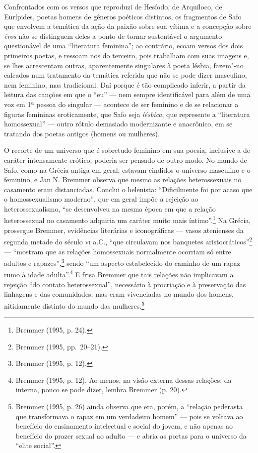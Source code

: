 Confrontados com os versos que reproduzi de Hesíodo, de Arquíloco, de Eurípides,
poetas homens de gêneros poéticos distintos, os fragmentos de Safo que envolvem
a temática da ação da paixão sobre sua vítima e a concepção sobre \textit{éros}
não se distinguem deles a ponto de tornar sustentável o argumento questionável
de uma “literatura feminina”; ao contrário, ecoam versos
dos dois primeiros poetas, e ressoam nos do terceiro, pois trabalham com
suas imagens e, se lhes acrescentam outras, aparentemente singulares à poeta
lésbia, fazem"-no calcados num tratamento da temática referida que não se pode
dizer masculino, nem feminino, mas tradicional. Daí porque é tão complicado
inferir, a partir da leitura das canções em que o “eu” --- nem sempre
identificável para além de uma voz em 1ª pessoa do singular --- acontece de ser
feminino e de se relacionar a figuras femininas eroticamente, que Safo seja
\textit{lésbica}, que represente a “literatura homossexual” --- outro rótulo
demasiado modernizante e anacrônico, em se tratando dos poetas antigos
(homens ou mulheres).

O recorte de um universo que é sobretudo feminino em sua poesia, inclusive
a de caráter intensamente erótico, poderia ser pensado de outro modo. No mundo
de Safo, como na Grécia antiga em geral, estavam cindidos o universo masculino
e o feminino, e Jan N. Bremmer observa que mesmo as relações
heterossexuais no casamento eram distanciadas. Conclui o helenista:
“Dificilmente foi por acaso que o homossexualismo moderno”, que em geral impõe
a rejeição ao heterossexualismo, “se desenvolveu na mesma época em que a
relação heterossexual no casamento adquiria um caráter muito mais íntimo”.\footnote{ Bremmer (1995, p. 24).} Na
Grécia, prossegue Bremmer, evidências literárias e iconográficas --- vasos
atenienses da segunda metade do século \textsc{vi} a.C., “que circulavam nos banquetes
aristocráticos”\footnote{ Bremmer (1995, pp.~20--21).} --- “mostram que as relações homossexuais normalmente
ocorriam só entre adultos e rapazes”,\footnote{ Bremmer (1995, p. 12).} sendo “um aspecto estabelecido do
caminho de um rapaz rumo à idade adulta”.\footnote{ Bremmer (1995, p. 12). Ao menos, na visão
externa dessas relações; da interna, pouco se pode dizer, lembra Bremmer (p.
20).} E frisa Bremmer que tais relações não implicavam a rejeição “do contato
heterossexual”, necessário à procriação e à preservação das linhagens e das
comunidades, mas eram vivenciadas no mundo dos homens, nitidamente distinto do
mundo das mulheres.\footnote{ Bremmer (1995, p. 26) ainda observa que era,
porém, a “relação pederasta que transformava o rapaz em um verdadeiro homem” ---
pois se voltava ao benefício do ensinamento intelectual e social do jovem, e
não apenas ao benefício do prazer sexual ao adulto --- e abria as portas para o
universo da “elite social”.}

